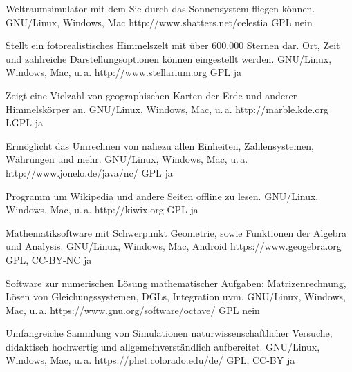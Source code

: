 




{Weltraumsimulator mit dem Sie durch das Sonnensystem fliegen können.}
{GNU/Linux, Windows, Mac}
{http://www.shatters.net/celestia}
{GPL}
{nein}

{Stellt ein fotorealistisches Himmelszelt mit über 600.000 Sternen dar. Ort, Zeit und zahlreiche Darstellungsoptionen können eingestellt werden.}
{GNU/Linux, Windows, Mac, u.\,a.}
{http://www.stellarium.org}
{GPL}
{ja}

{Zeigt eine Vielzahl von geographischen Karten der Erde und anderer Himmelskörper an.}
{GNU/Linux, Windows, Mac, u.\,a.}
{http://marble.kde.org}
{LGPL}
{ja}

{Ermöglicht das Umrechnen von nahezu allen Einheiten, Zahlensystemen, Währungen und mehr.}
{GNU/Linux, Windows, Mac, u.\,a.}
{http://www.jonelo.de/java/nc/}
{GPL}
{ja}

{Programm um Wikipedia und andere Seiten offline zu lesen.}
{GNU/Linux, Windows, Mac, u.\,a.}
{http://kiwix.org}
{GPL}
{ja}

{Mathematiksoftware mit Schwerpunkt Geometrie, sowie Funktionen der Algebra und Analysis.}
{GNU/Linux, Windows, Mac, Android}
{https://www.geogebra.org}
{GPL, CC-BY-NC}
{ja}

{Software zur numerischen Lösung mathematischer Aufgaben: Matrizenrechnung, Lösen von Gleichungssystemen, DGLs, Integration uvm.}
{GNU/Linux, Windows, Mac, u.\,a.}
{https://www.gnu.org/software/octave/}
{GPL}
{nein}

{Umfangreiche Sammlung von Simulationen naturwissenschaftlicher Versuche, didaktisch hochwertig und allgemeinverständlich aufbereitet.}
{GNU/Linux, Windows, Mac, u.\,a.}
{https://phet.colorado.edu/de/}
{GPL, CC-BY}
{ja}

\backpage



